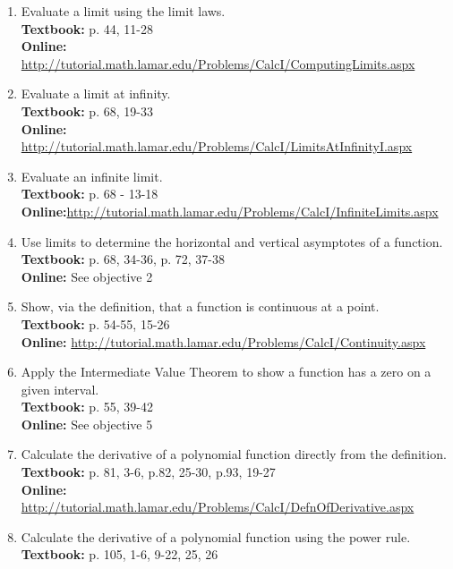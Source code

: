 \documentclass[12pt,landscape]{article}
\begin{document}

\begin{multicols}{2}
\begin{enumerate}
\item Evaluate a limit using the limit laws.\\
\textbf{Textbook:} p. 44, 11-28\\
\textbf{Online:} \url{http://tutorial.math.lamar.edu/Problems/CalcI/ComputingLimits.aspx}
\item Evaluate a limit at infinity.\\
\textbf{Textbook:} p. 68, 19-33\\
\textbf{Online:} \url{http://tutorial.math.lamar.edu/Problems/CalcI/LimitsAtInfinityI.aspx}
\url{}
\item Evaluate an infinite limit.\\
\textbf{Textbook:} p. 68 - 13-18\\
\textbf{Online:}\url{http://tutorial.math.lamar.edu/Problems/CalcI/InfiniteLimits.aspx}
\item Use limits to determine the horizontal and vertical asymptotes of a function.\\
\textbf{Textbook:} p. 68, 34-36, p. 72, 37-38\\
\textbf{Online:} See objective 2
\item Show, via the definition, that a function is continuous at a point.\\
\textbf{Textbook:} p. 54-55, 15-26\\
\textbf{Online:} \url{http://tutorial.math.lamar.edu/Problems/CalcI/Continuity.aspx}
\item Apply the Intermediate Value Theorem to show a function has a zero on a given interval.\\
\textbf{Textbook:} p. 55, 39-42\\
\textbf{Online:} See objective 5
\vspace{1in}
\item Calculate the derivative of a polynomial function directly from the definition.\\
\textbf{Textbook:} p. 81, 3-6, p.82, 25-30, p.93, 19-27\\
\textbf{Online:} \url{http://tutorial.math.lamar.edu/Problems/CalcI/DefnOfDerivative.aspx}
\item Calculate the derivative of a polynomial function using the power rule.\\
\textbf{Textbook:} p. 105, 1-6, 9-22, 25, 26\\

\end{enumerate}
\end{multicols}
\end{document}
